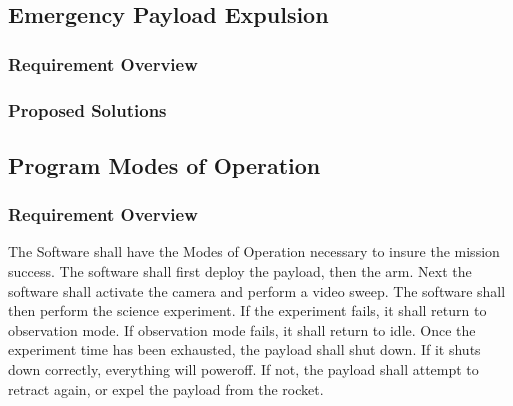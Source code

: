 \documentclass[letterpaper,10pt]{article}
\begin{document}
\subsection{Emergency Payload Expulsion}
\subsubsection{Requirement Overview}
\subsubsection{Proposed Solutions}
\subsection{Program Modes of Operation}
\subsubsection{Requirement Overview}
The Software shall have the Modes of Operation necessary to insure the mission success.
The software shall first deploy the payload, then the arm. Next the software shall activate the 
camera and perform a video sweep. The software shall then perform the science experiment.
If the experiment fails, it shall return to observation mode.
If observation mode fails, it shall return to idle.
Once the experiment time has been exhausted, the payload shall shut down.
If it shuts down correctly, everything will poweroff. If not, the payload shall attempt to retract 
again, or expel the payload from the rocket.
\end{document}
